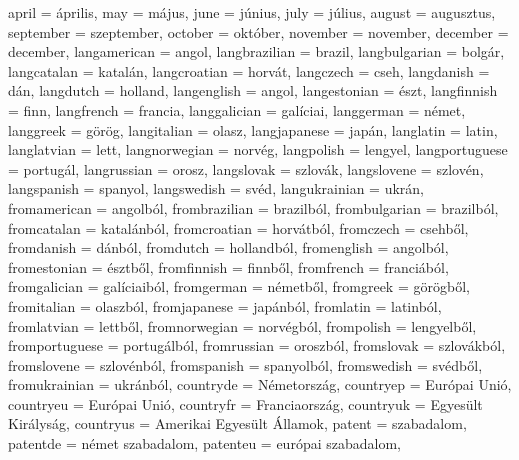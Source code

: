 {		april            = {\'aprilis},
		may              = {m\'ajus},
		june             = {j\'unius},
		july             = {j\'ulius},
		august           = {augusztus},
		september        = {szeptember},
		october          = {okt\'ober},
		november         = {november},
		december         = {december},
		langamerican     = {angol},
		langbrazilian    = {brazil},
		langbulgarian    = {bolg\'ar},
		langcatalan      = {katal\'an},
		langcroatian     = {horv\'at},
		langczech        = {cseh},
		langdanish       = {d\'an},
		langdutch        = {holland},
		langenglish      = {angol},
		langestonian     = {\'eszt},
		langfinnish      = {finn},
		langfrench       = {francia},
		langgalician     = {gal\'iciai},
		langgerman       = {n\'emet},
		langgreek        = {g\"or\"og},
		langitalian      = {olasz},
		langjapanese     = {jap\'an},
		langlatin        = {latin},
		langlatvian      = {lett},
		langnorwegian    = {norv\'eg},
		langpolish       = {lengyel},
		langportuguese   = {portug\'al},
		langrussian      = {orosz},
		langslovak       = {szlov\'ak},
		langslovene      = {szlov\'en},
		langspanish      = {spanyol},
		langswedish      = {sv\'ed},
		langukrainian    = {ukr\'an},
		fromamerican     = {angolb\'ol},
		frombrazilian    = {brazilb\'ol},
		frombulgarian    = {brazilb\'ol},
		fromcatalan      = {katal\'anb\'ol},
		fromcroatian     = {horv\'atb\'ol},
		fromczech        = {csehb\H{o}l},
		fromdanish       = {d\'anb\'ol},
		fromdutch        = {hollandb\'ol},
		fromenglish      = {angolb\'ol},
		fromestonian     = {\'esztb\H{o}l},
		fromfinnish      = {finnb\H{o}l},
		fromfrench       = {franci\'ab\'ol},
		fromgalician     = {gal\'iciaib\'ol},
		fromgerman       = {n\'emetb\H{o}l},
		fromgreek        = {g\"or\"ogb\H{o}l},
		fromitalian      = {olaszb\'ol},
		fromjapanese     = {jap\'anb\'ol},
		fromlatin        = {latinb\'ol},
		fromlatvian      = {lettb\H{o}l},
		fromnorwegian    = {norv\'egb\'ol},
		frompolish       = {lengyelb\H{o}l},
		fromportuguese   = {portug\'alb\'ol},
		fromrussian      = {oroszb\'ol},
		fromslovak       = {szlov\'akb\'ol},
		fromslovene      = {szlov\'enb\'ol},
		fromspanish      = {spanyolb\'ol},
		fromswedish      = {sv\'edb\H{o}l},
		fromukrainian    = {ukr\'anb\'ol},
		countryde        = {N\'emetorsz\'ag},
		countryep        = {Eur\'opai Uni\'o},
		countryeu        = {Eur\'opai Uni\'o},
		countryfr        = {Franciaorsz\'ag},
		countryuk        = {Egyes\"ult Kir\'alys\'ag},
		countryus        = {Amerikai Egyes\"ult \'Allamok},
		patent           = {szabadalom},
		patentde         = {n\'emet szabadalom},
		patenteu         = {eur\'opai szabadalom},
}
